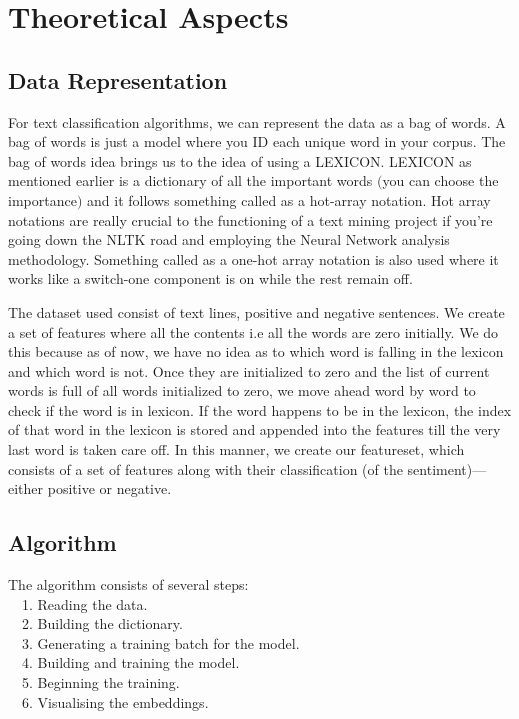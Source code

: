 \documentclass[a4paper,10pt]{report}
\begin{document}
\section{Theoretical Aspects}
\subsection{Data Representation}

For text classification algorithms, we can represent the data as a bag of words. A bag of words 
is just a model where you ID each unique word in your corpus. The bag of words idea brings us to 
the idea of using a LEXICON. LEXICON as mentioned earlier is a dictionary of all the important words $($you can choose the importance$)$ 
and it follows something called as a hot-array notation. Hot array notations are really crucial to the functioning of a text mining project if you’re going down the NLTK road and employing the Neural Network analysis methodology. Something called as a one-hot array
notation is also used where it works like a switch-one component is on while the rest remain off.

The dataset used consist of text lines, positive and negative sentences. We create a set of features where all the contents i.e all the words are zero initially. We do this because as 
of now, we have no idea as to which word is falling in the lexicon and which word is not. Once they are initialized to zero and the list of current words is full of all words initialized 
to zero, we move ahead word by word to check if the word is in lexicon. If the word happens to be in the lexicon, the index of that word in the lexicon is stored and appended into the features till the very last word is taken care off. In this manner, 
we create our featureset, which consists of a set of features along with their classification (of the sentiment)— either positive or negative.


\subsection{Algorithm}
The algorithm consists of several steps: \\
\-\ \-\ 1. Reading the data. \\
\-\ \-\ 2. Building the dictionary. \\
\-\ \-\ 3. Generating a training batch for the model. \\
\-\ \-\ 4. Building and training the model. \\
\-\ \-\ 5. Beginning the training. \\
\-\ \-\ 6. Visualising the embeddings. \\
\end{document}
